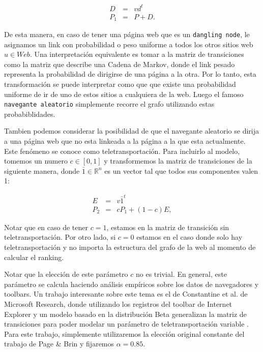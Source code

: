 \begin{eqnarray*}
D & = & v d^t \\
P_1 & = & P + D.
\end{eqnarray*}

De esta manera, en caso de tener una página web que es un \texttt{dangling node}, le asignamos un link con probabilidad o peso uniforme a todos los otros sitios web $u \in Web$. Una interpretación equivalente es tomar a la matriz de transiciones como la matriz que describe una Cadena de Markov, donde el link pesado representa la probabilidad de dirigirse de una página a la otra. Por lo tanto, esta transformación se puede interpretar como que que existe una probabilidad uniforme de ir de uno de estos sitios a cualquiera de la web. Luego el famoso \texttt{navegante aleatorio} simplemente recorre el grafo utilizando estas probabiblidades.

Tambien podemos considerar la posibilidad de que el navegante aleatorio se dirija a una página web que no esta linkeada a la página a la que esta actualmente. Este fenómeno se conoce como teletransportación. Para incluirlo al modelo, tomemos un numero $c \in [0,1]$ y transformemos la matriz de transiciones de la siguiente manera, donde $\bar{1} \in \mathbb{R}^n$ es un vector tal que todos sus componentes valen 1:

\begin{eqnarray*}
E & = & v \bar{1}^t \\
P_2 & = & cP_1 + (1-c)E,
\end{eqnarray*}

Notar que en caso de tener $c=1$, estamos en la matriz de transición sin teletransportación. Por otro lado, si $c=0$ estamos en el caso donde solo hay teletransportación y no importa la estructura del grafo de la web al momento de calcular el ranking.

Notar que la elección de este parámetro $c$ no es trivial. En general, este parámetro se calcula haciendo análisis empíricos sobre los datos de navegadores y toolbars. Un trabajo interesante sobre este tema es el de Constantine et al. de Microsoft Research, donde utilizando los registros del toolbar de Internet Explorer y un modelo basado en la distribución Beta generalizan la matriz de transiciones para poder modelar un parámetro de teletransportación variable \cite{TeleParam}. Para este trabajo, simplemente utilizaremos la elección original constante del trabajo de Page \& Brin \cite{Brin1998} y fijaremos $\alpha = 0.85$.

\pagebreak

